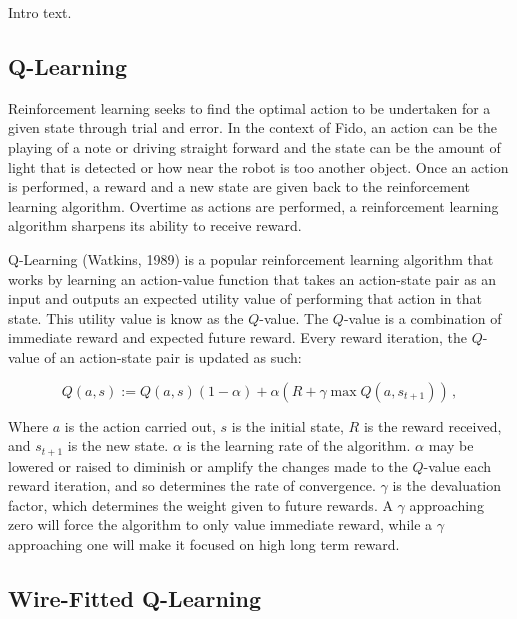 Intro text.

\subsection{Q-Learning}

Reinforcement learning seeks to find the optimal action to be undertaken for a given state through trial and error. In the context of Fido, an action can be the playing of a note or driving straight forward and the state can be the amount of light that is detected or how near the robot is too another object. Once an action is performed, a reward and a new state are given back to the reinforcement learning algorithm. Overtime as actions are performed, a reinforcement learning algorithm sharpens its ability to receive reward.

Q-Learning (Watkins, 1989) is a popular reinforcement learning algorithm that works by learning an action-value function that takes an action-state pair as an input and outputs an expected utility value of performing that action in that state. This utility value is know as the $Q$-value. The $Q$-value is a combination of immediate reward and expected future reward. Every reward iteration, the $Q$-value of an action-state pair is updated as such:

\begin{equation}
	Q(a, s) := Q(a, s)(1 - \alpha) + \alpha(R + \gamma \max Q(a, s_{t+1}))
	\,,
\end{equation}

Where $a$ is the action carried out, $s$ is the initial state, $R$ is the reward received, and $s_{t+1}$ is the new state. $\alpha$ is the learning rate of the algorithm. $\alpha$ may be lowered or raised to diminish or amplify the changes made to the $Q$-value each reward iteration, and so determines the rate of convergence. $\gamma$ is the devaluation factor, which determines the weight given to future rewards. A $\gamma$ approaching zero will force the algorithm to only value immediate reward, while a $\gamma$ approaching one will make it focused on high long term reward.

\subsection{Wire-Fitted Q-Learning}
